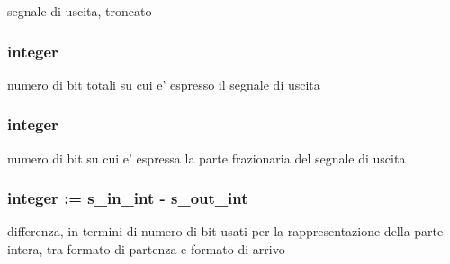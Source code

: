 segnale di uscita, troncato 

\hypertarget{group___truncate_ga8b62f8bfecb0fab845995b8b051101bc}{
\subsubsection[{s\+\_\+out\+\_\+dim}]{ {\bfseries \textcolor{vhdlchar}{ }} {\bfseries \textcolor{vhdlchar}{integer}\textcolor{vhdlchar}{ }} \hspace{0.3cm}{\ttfamily [Generic]}}}\label{group___truncate_ga8b62f8bfecb0fab845995b8b051101bc}


numero di bit totali su cui e' espresso il segnale di uscita 

\hypertarget{group___truncate_ga4ca792ca981e2f9d82bf36d9c82c08af}{
\subsubsection[{s\+\_\+out\+\_\+int}]{ {\bfseries \textcolor{vhdlchar}{ }} {\bfseries \textcolor{vhdlchar}{integer}\textcolor{vhdlchar}{ }} \hspace{0.3cm}{\ttfamily [Generic]}}}\label{group___truncate_ga4ca792ca981e2f9d82bf36d9c82c08af}


numero di bit su cui e' espressa la parte frazionaria del segnale di uscita 

\hypertarget{group___truncate_ga63701d8af27da7452a7588efcff357bc}{
\subsubsection[{x}]{ {\bfseries \textcolor{vhdlchar}{integer}\textcolor{vhdlchar}{ }\textcolor{vhdlchar}{ }\textcolor{vhdlchar}{\+:}\textcolor{vhdlchar}{=}\textcolor{vhdlchar}{ }\textcolor{vhdlchar}{ }\textcolor{vhdlchar}{ }\textcolor{vhdlchar}{ }{\bfseries {\bf s\+\_\+in\+\_\+int}} \textcolor{vhdlchar}{-\/}\textcolor{vhdlchar}{ }\textcolor{vhdlchar}{ }\textcolor{vhdlchar}{ }{\bfseries {\bf s\+\_\+out\+\_\+int}} \textcolor{vhdlchar}{ }} \hspace{0.3cm}{\ttfamily [Constant]}}}\label{group___truncate_ga63701d8af27da7452a7588efcff357bc}


differenza, in termini di numero di bit usati per la rappresentazione della parte intera, tra formato di partenza e formato di arrivo 

